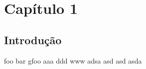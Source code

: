 
\newpage
\chapter{Capítulo 1}
\label{cha:capitulo_1}

\section{Introdução}
    foo bar gfoo
    aaa ddd www 
    adsa asd asd asda